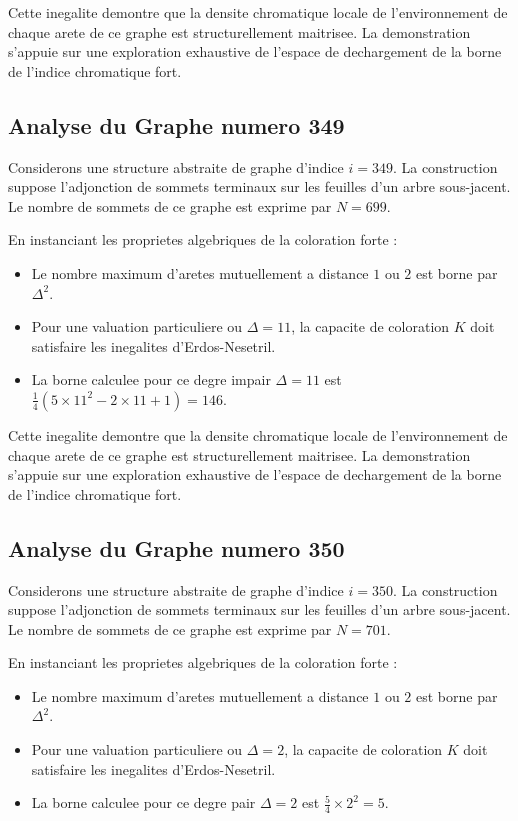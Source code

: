 \documentclass[11pt,a4paper]{article}
\begin{document}
Cette inegalite demontre que la densite chromatique locale de l'environnement de chaque arete de ce graphe est structurellement maitrisee. La demonstration s'appuie sur une exploration exhaustive de l'espace de dechargement de la borne de l'indice chromatique fort.

\subsection{Analyse du Graphe numero 349}
Considerons une structure abstraite de graphe d'indice $i = 349$. La construction suppose l'adjonction de sommets terminaux sur les feuilles d'un arbre sous-jacent. Le nombre de sommets de ce graphe est exprime par $N = 699$.

En instanciant les proprietes algebriques de la coloration forte :
\begin{itemize}
\item Le nombre maximum d'aretes mutuellement a distance $1$ ou $2$ est borne par $\Delta^2$.
\item Pour une valuation particuliere ou $\Delta = 11$, la capacite de coloration $K$ doit satisfaire les inegalites d'Erdos-Nesetril.
\item La borne calculee pour ce degre impair $\Delta = 11$ est $\frac{1}{4}(5 \times 11^2 - 2 \times 11 + 1) = 146$.
\end{itemize}

Cette inegalite demontre que la densite chromatique locale de l'environnement de chaque arete de ce graphe est structurellement maitrisee. La demonstration s'appuie sur une exploration exhaustive de l'espace de dechargement de la borne de l'indice chromatique fort.

\subsection{Analyse du Graphe numero 350}
Considerons une structure abstraite de graphe d'indice $i = 350$. La construction suppose l'adjonction de sommets terminaux sur les feuilles d'un arbre sous-jacent. Le nombre de sommets de ce graphe est exprime par $N = 701$.

En instanciant les proprietes algebriques de la coloration forte :
\begin{itemize}
\item Le nombre maximum d'aretes mutuellement a distance $1$ ou $2$ est borne par $\Delta^2$.
\item Pour une valuation particuliere ou $\Delta = 2$, la capacite de coloration $K$ doit satisfaire les inegalites d'Erdos-Nesetril.
\item La borne calculee pour ce degre pair $\Delta = 2$ est $\frac{5}{4} \times 2^2 = 5$.
\end{itemize}
\end{document}
